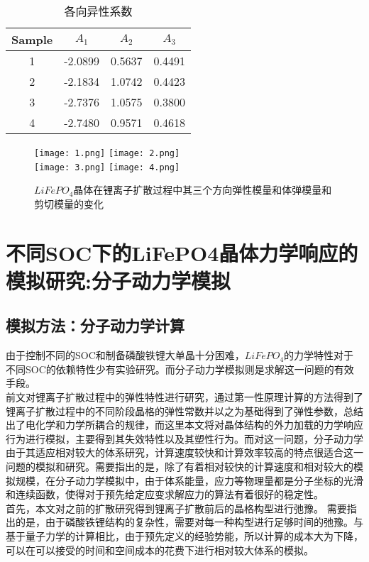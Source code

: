 \begin{table}
	\centering
	\caption{各向异性系数}
    \label{tab:A}
    \begin{tabular}{ | c | c | c | c |}
    \hline
    \hline
    Sample & $A_1$ & $A_2$ & $A_3$\\ \hline \hline
    1 & -2.0899 & 0.5637 & 0.4491\\
    2 & -2.1834 & 1.0742 & 0.4423 \\
    3 & -2.7376 & 1.0575 & 0.3800\\
   	4 & -2.7480 & 0.9571 & 0.4618\\
    \hline
    \hline
    \end{tabular}
\end{table}

\begin{figure}
  \centering
  \texttt{[image: 1.png]}\hfill
  \texttt{[image: 2.png]}\\[0.5mm]
  \texttt{[image: 3.png]}\hfill
  \texttt{[image: 4.png]}
  \caption{$LiFePO_4$晶体在锂离子扩散过程中其三个方向弹性模量和体弹模量和剪切模量的变化} 
	\label{fig:mat}
\end{figure}






\section{不同SOC下的LiFePO4晶体力学响应的模拟研究:分子动力学模拟}
\subsection{模拟方法：分子动力学计算}
由于控制不同的SOC\cite{Qi2010Threefold}和制备磷酸铁锂大单晶十分困难，$LiFePO_4$的力学特性对于不同SOC的依赖特性少有实验研究。而分子动力学模拟则是求解这一问题的有效手段。\\
\indent 前文对锂离子扩散过程中的弹性特性进行研究，通过第一性原理计算的方法得到了锂离子扩散过程中的不同阶段晶格的弹性常数并以之为基础得到了弹性参数，总结出了电化学和力学所耦合的规律，而这里本文将对晶体结构的外力加载的力学响应行为进行模拟，主要得到其失效特性以及其塑性行为。而对这一问题，分子动力学由于其适应相对较大的体系研究，计算速度较快和计算效率较高的特点很适合这一问题的模拟和研究。需要指出的是，除了有着相对较快的计算速度和相对较大的模拟规模，在分子动力学模拟中，由于体系能量，应力等物理量都是分子坐标的光滑和连续函数，使得对于预先给定应变求解应力的算法有着很好的稳定性。\\
\indent  首先，本文对之前的扩散研究得到锂离子扩散前后的晶格构型进行弛豫。 需要指出的是，由于磷酸铁锂结构的复杂性，需要对每一种构型进行足够时间的弛豫。与基于量子力学的计算相比，由于预先定义的经验势能，所以计算的成本大为下降，可以在可以接受的时间和空间成本的花费下进行相对较大体系的模拟。\\
